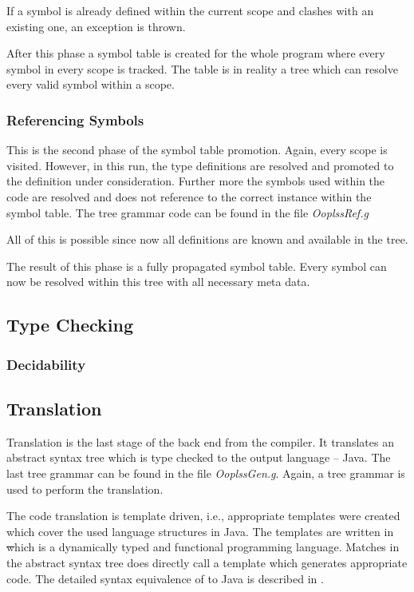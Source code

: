 If a symbol is already defined within the current scope and clashes with
an existing one, an exception is thrown.

After this phase a symbol table is created for the whole program where
every symbol in every scope is tracked. The table is in reality a tree
which can resolve every valid symbol within a scope.

\subsubsection{Referencing Symbols}
This is the second phase of the symbol table promotion. Again, every scope
is visited. However, in this run, the type definitions are resolved and
promoted to the definition under consideration. Further more the symbols
used within the code are resolved and does not reference to the correct
instance within the symbol table. The tree grammar code can be found in
the file \emph{OoplssRef.g}

All of this is possible since now all definitions are known and available
in the tree.

The result of this phase is a fully propagated symbol table. Every symbol can
now be resolved within this tree with all necessary meta data.

\subsection{Type Checking}
\subsubsection{Decidability}

\subsection{Translation}
Translation is the last stage of the back end from the compiler. It
translates an abstract syntax tree which is type checked to the
output language -- Java. The last tree grammar can be found in the
file \emph{OoplssGen.g}. Again, a tree grammar is used to perform the
translation.

The code translation is template driven, i.e., appropriate templates
were created which cover the used language structures in Java. The
templates are written in \st which is a dynamically typed and functional
programming language. Matches in the abstract syntax tree does directly
call a template which generates appropriate code. The detailed syntax
equivalence of \ooplss to Java is described in .

